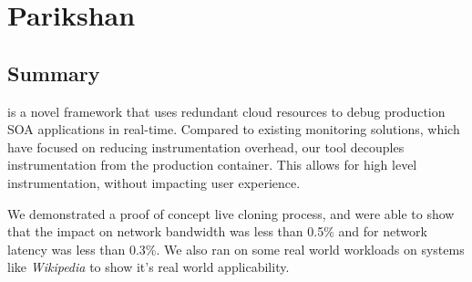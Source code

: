 \chapter{Parikshan}
\label{ch:parikshan}





\section{Summary}
\label{sec:parikshanSummary}

\parikshan is a novel framework that uses redundant cloud resources to debug production SOA applications in real-time.
Compared to existing monitoring solutions, which have focused on reducing instrumentation overhead, our tool decouples instrumentation from the production container.
This allows for high level instrumentation, without impacting user experience.

We demonstrated a proof of concept live cloning process, and were able to show that the impact on network bandwidth was less than 0.5\% and for network latency was less than 0.3\%. 
We also ran \parikshan on some real world workloads on systems like \emph{Wikipedia} to show it's real world applicability.







